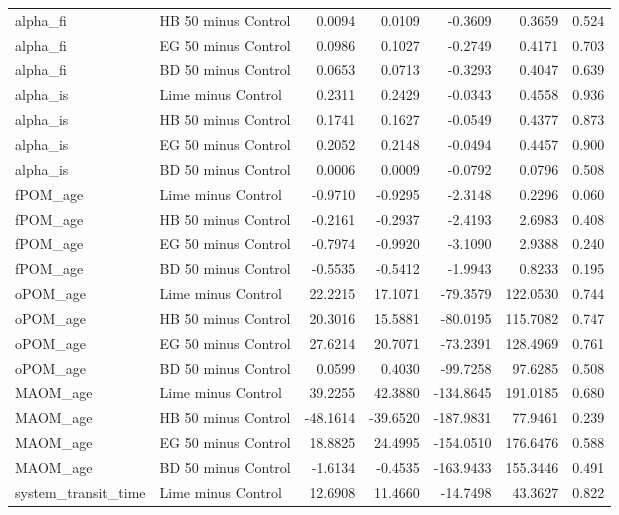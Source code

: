 \documentclass[preprint,12pt]{elsarticle}
\begin{document}
\begin{landscape}
\begin{longtable}{@{} >{\raggedright\arraybackslash}p{3.5cm} >{\raggedright\arraybackslash}p{4.0cm} r r r r r @{} }
alpha\_\allowbreak{}fi & HB 50 minus Control & 0.0094 & 0.0109 & -0.3609 & 0.3659 & 0.524 \\
alpha\_\allowbreak{}fi & EG 50 minus Control & 0.0986 & 0.1027 & -0.2749 & 0.4171 & 0.703 \\
alpha\_\allowbreak{}fi & BD 50 minus Control & 0.0653 & 0.0713 & -0.3293 & 0.4047 & 0.639 \\
alpha\_\allowbreak{}is & Lime minus Control & 0.2311 & 0.2429 & -0.0343 & 0.4558 & 0.936 \\
alpha\_\allowbreak{}is & HB 50 minus Control & 0.1741 & 0.1627 & -0.0549 & 0.4377 & 0.873 \\
alpha\_\allowbreak{}is & EG 50 minus Control & 0.2052 & 0.2148 & -0.0494 & 0.4457 & 0.900 \\
alpha\_\allowbreak{}is & BD 50 minus Control & 0.0006 & 0.0009 & -0.0792 & 0.0796 & 0.508 \\
fPOM\_\allowbreak{}age & Lime minus Control & -0.9710 & -0.9295 & -2.3148 & 0.2296 & 0.060 \\
fPOM\_\allowbreak{}age & HB 50 minus Control & -0.2161 & -0.2937 & -2.4193 & 2.6983 & 0.408 \\
fPOM\_\allowbreak{}age & EG 50 minus Control & -0.7974 & -0.9920 & -3.1090 & 2.9388 & 0.240 \\
fPOM\_\allowbreak{}age & BD 50 minus Control & -0.5535 & -0.5412 & -1.9943 & 0.8233 & 0.195 \\
oPOM\_\allowbreak{}age & Lime minus Control & 22.2215 & 17.1071 & -79.3579 & 122.0530 & 0.744 \\
oPOM\_\allowbreak{}age & HB 50 minus Control & 20.3016 & 15.5881 & -80.0195 & 115.7082 & 0.747 \\
oPOM\_\allowbreak{}age & EG 50 minus Control & 27.6214 & 20.7071 & -73.2391 & 128.4969 & 0.761 \\
oPOM\_\allowbreak{}age & BD 50 minus Control & 0.0599 & 0.4030 & -99.7258 & 97.6285 & 0.508 \\
MAOM\_\allowbreak{}age & Lime minus Control & 39.2255 & 42.3880 & -134.8645 & 191.0185 & 0.680 \\
MAOM\_\allowbreak{}age & HB 50 minus Control & -48.1614 & -39.6520 & -187.9831 & 77.9461 & 0.239 \\
MAOM\_\allowbreak{}age & EG 50 minus Control & 18.8825 & 24.4995 & -154.0510 & 176.6476 & 0.588 \\
MAOM\_\allowbreak{}age & BD 50 minus Control & -1.6134 & -0.4535 & -163.9433 & 155.3446 & 0.491 \\
system\_\allowbreak{}transit\_\allowbreak{}time & Lime minus Control & 12.6908 & 11.4660 & -14.7498 & 43.3627 & 0.822 \\

\end{longtable}
\end{landscape}
\end{document}

